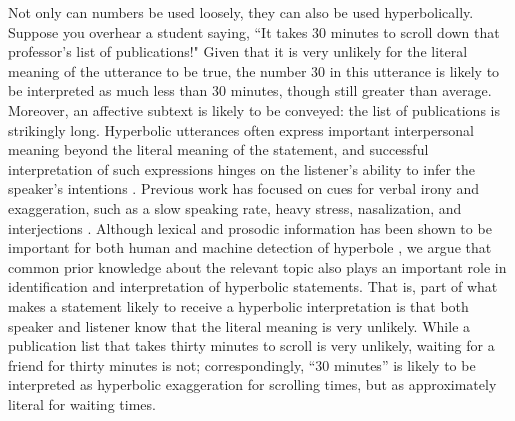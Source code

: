 \documentclass{article} %
\begin{document}
Not only can numbers be used loosely, they can also be used hyperbolically. Suppose you overhear a student saying, ``It takes 30 minutes to scroll down that professor's list of publications!" Given that it is very unlikely for the literal meaning of the utterance to be true, the number $30$ in this utterance is likely to be interpreted as much less than 30 minutes, though still greater than average. Moreover, an affective subtext is likely to be conveyed: the list of publications is strikingly long.
Hyperbolic utterances often express important interpersonal meaning beyond the literal meaning of the statement, and successful interpretation of such expressions hinges on the listener's ability to infer the speaker's intentions \cite{mccarthy2004there, gibbs2000irony, cano2003risk}. Previous work has focused on cues for verbal irony and exaggeration, such as a slow speaking rate, heavy stress, nasalization, and interjections \cite{kreuz1995two, kreuz2007lexical}. Although lexical and prosodic information has been shown to be important for both human and machine detection of hyperbole \cite{davidov2010semi, reyes2011mining, van2007algorithm}, we argue that common prior knowledge about the relevant topic
also plays an important role in identification and interpretation of hyperbolic statements. That is, part of what makes a statement likely to receive a hyperbolic interpretation is that both speaker and listener know that the literal meaning is very unlikely. 
While a publication list that takes thirty minutes to scroll is very unlikely, waiting for a friend for thirty minutes is not; correspondingly, ``30 minutes'' is likely to be interpreted as hyperbolic exaggeration for scrolling times, but as approximately literal for waiting times.

\end{document}
